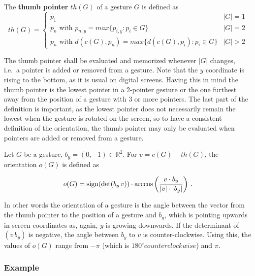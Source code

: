 \begin{defn}
	The \textbf{thumb pointer} $th(G)$ of a gesture $G$ is defined as
	\begin{equation}
	th(G) = \left\{
	\begin{array}{ll}
	p_1 & |G| = 1 \\
	p_n \text{ with } p_{n,y} = max\{p_{i,y} : p_i \in G\} & |G| = 2 \\
	p_n \text{ with } d(c(G), p_n) = max\{ d(c(G), p_i) : p_i \in G \}& |G| > 2
	\end{array}
	\right.
	\end{equation}
\end{defn}
The thumb pointer shall be evaluated and memorized whenever $|G|$ changes, i.e.~a pointer is added or removed from a gesture.
Note that the $y$ coordinate is rising to the bottom, as it is usual on digital screens. Having this in mind the thumb pointer is the lowest pointer in a 2-pointer gesture or the one furthest away from the position of a gesture with 3 or more pointers. The last part of the definition is important, as the lowest pointer does not necessarily remain the lowest when the gesture is rotated on the screen, so to have a consistent definition of the orientation, the thumb pointer may only be evaluated when pointers are added or removed from a gesture.

\begin{defn}
	Let $G$ be a gesture, $b_y = (0, -1) \in \mathbb{R}^2$. For $v = c(G) - th(G)$, the orientation $o(G)$ is defined as
	
\begin{equation}
\label{eq:conc:orientation}
o(G) = \textnormal{sign}(\det(b_y\, v)) \cdot \arccos\left(\frac{v \cdot b_y}{|v| \cdot |b_y|}\right) \, .
\end{equation}	

\end{defn}


In other words the orientation of a gesture is the angle between the vector from the thumb pointer to the position of a gesture and $b_y$, which is pointing upwards in screen coordinates as, again, $y$ is growing downwards. If the determinant of $(v\,b_y)$ is negative, the angle between $b_y$ to $v$ is counter-clockwise\cite{Bronstein2012}. Using this, the values of $o(G)$ range from $-\pi$ (which is $180^\circ counterclockwise$) and $\pi$. 

\subsubsection{Example}

